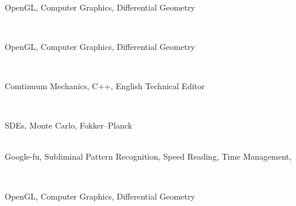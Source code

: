 \documentclass[a4paper]{MagicalCV}
\begin{document}
\begin{minipage}[t]{0.66\textwidth} 


 \\
\vspace{\topsep} %
\begin{tightemize}
\item  OpenGL, Computer Graphics, Differential Geometry
\end{tightemize}
\sectionsep

 \\
\vspace{\topsep} %
\begin{tightemize}
\item  OpenGL, Computer Graphics, Differential Geometry
\end{tightemize}
\sectionsep

 \\
\vspace{\topsep} %
\begin{tightemize}
\item  Comtinuum Mechanics, C++, English Technical Editor
\end{tightemize}
\sectionsep

 \\
\vspace{\topsep} %
\begin{tightemize}
\item  SDEs, Monte Carlo, Fokker–Planck
\end{tightemize}
\sectionsep

\\
Google-fu, Subliminal Pattern Recognition, Speed Reading, Time Management,
\sectionsep


 \\
\begin{tightemize}
\item  OpenGL, Computer Graphics, Differential Geometry
\end{tightemize}
\sectionsep


\end{minipage} 
\end{document}
